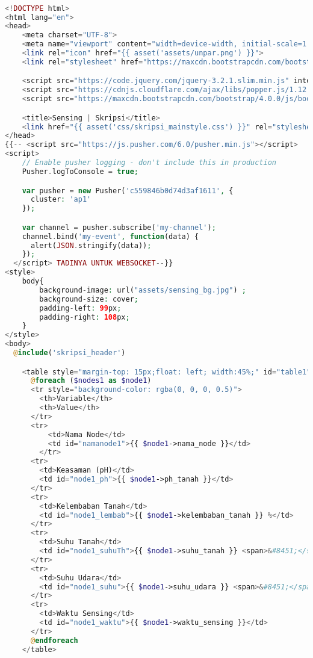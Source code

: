 \begin{lstlisting}[language=PHP, caption=skripsi\_sensing.blade.php]

<!DOCTYPE html>
<html lang="en">
<head>
    <meta charset="UTF-8">
    <meta name="viewport" content="width=device-width, initial-scale=1.0, shrink-to-fit=no">
    <link rel="icon" href="{{ asset('assets/unpar.png') }}">
    <link rel="stylesheet" href="https://maxcdn.bootstrapcdn.com/bootstrap/4.0.0/css/bootstrap.min.css" integrity="sha384-Gn5384xqQ1aoWXA+058RXPxPg6fy4IWvTNh0E263XmFcJlSAwiGgFAW/dAiS6JXm" crossorigin="anonymous">

    <script src="https://code.jquery.com/jquery-3.2.1.slim.min.js" integrity="sha384-KJ3o2DKtIkvYIK3UENzmM7KCkRr/rE9/Qpg6aAZGJwFDMVNA/GpGFF93hXpG5KkN" crossorigin="anonymous"></script>
    <script src="https://cdnjs.cloudflare.com/ajax/libs/popper.js/1.12.9/umd/popper.min.js" integrity="sha384-ApNbgh9B+Y1QKtv3Rn7W3mgPxhU9K/ScQsAP7hUibX39j7fakFPskvXusvfa0b4Q" crossorigin="anonymous"></script>
    <script src="https://maxcdn.bootstrapcdn.com/bootstrap/4.0.0/js/bootstrap.min.js" integrity="sha384-JZR6Spejh4U02d8jOt6vLEHfe/JQGiRRSQQxSfFWpi1MquVdAyjUar5+76PVCmYl" crossorigin="anonymous"></script>

    <title>Sensing | Skripsi</title>
    <link href="{{ asset('css/skripsi_mainstyle.css') }}" rel="stylesheet" type="text/css" >
</head>
{{-- <script src="https://js.pusher.com/6.0/pusher.min.js"></script>
<script>
    // Enable pusher logging - don't include this in production
    Pusher.logToConsole = true;

    var pusher = new Pusher('c559846b0d74d3af1611', {
      cluster: 'ap1'
    });

    var channel = pusher.subscribe('my-channel');
    channel.bind('my-event', function(data) {
      alert(JSON.stringify(data));
    });
  </script> TADINYA UNTUK WEBSOCKET--}}  
<style>
    body{
        background-image: url("assets/sensing_bg.jpg") ;
        background-size: cover;
        padding-left: 99px;
        padding-right: 108px;
    }
</style>
<body>
  @include('skripsi_header')

    <table style="margin-top: 15px;float: left; width:45%;" id="table1">
      @foreach ($nodes1 as $node1)
      <tr style="background-color: rgba(0, 0, 0, 0.5)">
        <th>Variable</th>
        <th>Value</th> 
      </tr>
      <tr>
          <td>Nama Node</td>
          <td id="namanode1">{{ $node1->nama_node }}</td>
        </tr>
      <tr>
        <td>Keasaman (pH)</td>
        <td id="node1_ph">{{ $node1->ph_tanah }}</td>
      </tr>
      <tr>
        <td>Kelembaban Tanah</td>
        <td id="node1_lembab">{{ $node1->kelembaban_tanah }} %</td>
      </tr>
      <tr>
        <td>Suhu Tanah</td>
        <td id="node1_suhuTh">{{ $node1->suhu_tanah }} <span>&#8451;</span></td>
      </tr>
      <tr>
        <td>Suhu Udara</td>
        <td id="node1_suhu">{{ $node1->suhu_udara }} <span>&#8451;</span></td>
      </tr>
      <tr>
        <td>Waktu Sensing</td>
        <td id="node1_waktu">{{ $node1->waktu_sensing }}</td>
      </tr>
      @endforeach
    </table>


\end{lstlisting}
